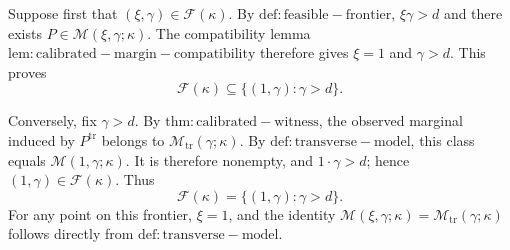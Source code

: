 Suppose first that \((\xi,\gamma)\in\mathcal F(\kappa)\). By \(\mathrm{def:feasible-frontier}\), \(\xi\gamma>d\) and there exists \(P\in\mathcal M(\xi,\gamma;\kappa)\). The compatibility lemma \(\mathrm{lem:calibrated-margin-compatibility}\) therefore gives \(\xi=1\) and \(\gamma>d\). This proves
\[
\mathcal F(\kappa)\subseteq\{(1,\gamma):\gamma>d\}.
\]

Conversely, fix \(\gamma>d\). By \(\mathrm{thm:calibrated-witness}\), the observed marginal induced by \(P^{\mathrm{tr}}\) belongs to \(\mathcal M_{\mathrm{tr}}(\gamma;\kappa)\). By \(\mathrm{def:transverse-model}\), this class equals \(\mathcal M(1,\gamma;\kappa)\). It is therefore nonempty, and \(1\cdot\gamma>d\); hence \((1,\gamma)\in\mathcal F(\kappa)\). Thus
\[
\mathcal F(\kappa)=\{(1,\gamma):\gamma>d\}.
\]
For any point on this frontier, \(\xi=1\), and the identity \(\mathcal M(\xi,\gamma;\kappa)=\mathcal M_{\mathrm{tr}}(\gamma;\kappa)\) follows directly from \(\mathrm{def:transverse-model}\).